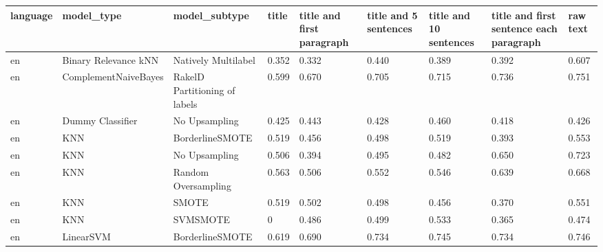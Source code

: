 \begin{tabular}{lllllllll}
\toprule
language &                      model\_type &                 model\_subtype & title & title and first paragraph & title and 5 sentences & title and 10 sentences & title and first sentence each paragraph &  raw text \\
\midrule
      en &            Binary Relevance kNN &           Natively Multilabel & 0.352 &                     0.332 &                 0.440 &                  0.389 &                                   0.392 &     0.607 \\
      en &            ComplementNaiveBayes & RakelD Partitioning of labels & 0.599 &                     0.670 &                 0.705 &                  0.715 &                                   0.736 &     0.751 \\
      en &                Dummy Classifier &                 No Upsampling & 0.425 &                     0.443 &                 0.428 &                  0.460 &                                   0.418 &     0.426 \\
      en &                             KNN &               BorderlineSMOTE & 0.519 &                     0.456 &                 0.498 &                  0.519 &                                   0.393 &     0.553 \\
      en &                             KNN &                 No Upsampling & 0.506 &                     0.394 &                 0.495 &                  0.482 &                                   0.650 &     0.723 \\
      en &                             KNN &           Random Oversampling & 0.563 &                     0.506 &                 0.552 &                  0.546 &                                   0.639 &     0.668 \\
      en &                             KNN &                         SMOTE & 0.519 &                     0.502 &                 0.498 &                  0.456 &                                   0.370 &     0.551 \\
      en &                             KNN &                      SVMSMOTE &     0 &                     0.486 &                 0.499 &                  0.533 &                                   0.365 &     0.474 \\
      en &                       LinearSVM &               BorderlineSMOTE & 0.619 &                     0.690 &                 0.734 &                  0.745 &                                   0.734 &     0.746 \\

\end{tabular}
